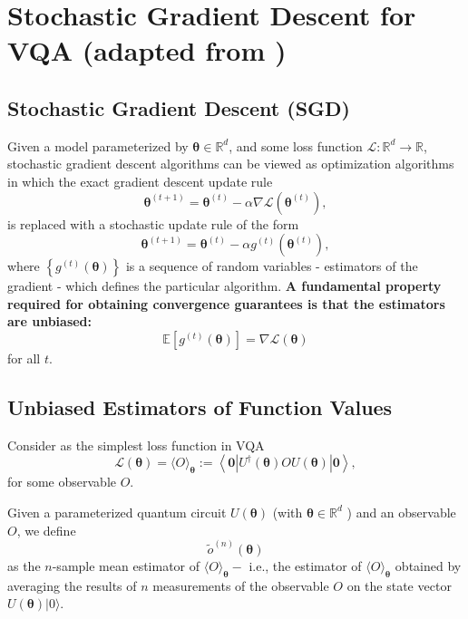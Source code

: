 \documentclass[
        11pt, %
	a4paper, %
]{LegrandOrangeBook}
\begin{document}
\section{Stochastic Gradient Descent for VQA (adapted from \cite{sweke2020stochastic})}

\subsection{Stochastic Gradient Descent (SGD)}

Given a model parameterized by $\boldsymbol{\theta} \in \mathbb{R}^d$, and some loss function $\mathcal{L}: \mathbb{R}^d \rightarrow \mathbb{R}$, stochastic gradient descent algorithms can be viewed as optimization algorithms in which the exact gradient descent update rule
\begin{equation}
    \boldsymbol{\theta}^{(t+1)}=\boldsymbol{\theta}^{(t)}-\alpha \nabla \mathcal{L}\left(\boldsymbol{\theta}^{(t)}\right),
\end{equation}
is replaced with a stochastic update rule of the form
\begin{equation}
    \boldsymbol{\theta}^{(t+1)}=\boldsymbol{\theta}^{(t)}-\alpha g^{(t)}\left(\boldsymbol{\theta}^{(t)}\right),
\end{equation}
where $\left\{g^{(t)}(\boldsymbol{\theta})\right\}$ is a sequence of random variables - estimators of the gradient - which defines the particular algorithm. \textbf{A fundamental property required for obtaining convergence guarantees is that the estimators are unbiased:}
\begin{equation}
    \mathbb{E}\left[g^{(t)}(\boldsymbol{\theta})\right]=\nabla \mathcal{L}(\boldsymbol{\theta})
\end{equation}
for all $t$. 

\subsection{Unbiased Estimators of Function Values}

Consider as the simplest loss function in VQA
\begin{equation}
    \mathcal{L}(\boldsymbol{\theta})=\langle O\rangle_{\boldsymbol{\theta}}:=\left\langle\mathbf{0}\left|U^{\dagger}(\boldsymbol{\theta}) OU(\boldsymbol{\theta})\right| \mathbf{0}\right\rangle,
\end{equation}
for some observable $O$.

\begin{definition}
    Given a parameterized quantum circuit $U(\boldsymbol{\theta})$ (with $\boldsymbol{\theta} \in \mathbb{R}^d$ ) and an observable $O$, we define $$
    \tilde{o}^{(n)}(\boldsymbol{\theta})
$$ as the $n$-sample mean estimator of $\langle O\rangle_{\boldsymbol{\theta}}-$ i.e., the estimator of $\langle O\rangle_{\boldsymbol{\theta}}$ obtained by averaging the results of $n$ measurements of the observable $O$ on the state vector $U(\boldsymbol{\theta})|0\rangle$.
\end{definition}
\end{document}
